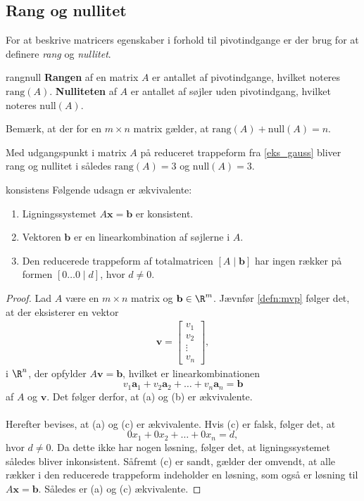 \subsection{Rang og nullitet}
% 
For at beskrive matricers egenskaber i forhold til pivotindgange er der brug for at definere \textit{rang} og \textit{nullitet}.
%
\begin{defn}{}{rangnull}
\textbf{Rangen} af en matrix $A$ er antallet af pivotindgange, hvilket noteres $\text{rang}(A)$.
\textbf{Nulliteten} af $A$ er antallet af søjler uden pivotindgang, hvilket noteres $\text{null}(A)$.
\end{defn}
%
\noindent
Bemærk, at der for en $m \times n$ matrix gælder, at $\text{rang}(A)+\text{null}(A)=n$.\\
%
\begin{eks}
Med udgangspunkt i matrix $A$ på reduceret trappeform fra \ref{eks_gauss} bliver rang og nullitet i således $\text{rang}(A)=3$ og $\text{null}(A)=3$.
\end{eks}
%
\begin{thm}{}{konsistens}
%
Følgende udsagn er ækvivalente:
%
\begin{enumerate}[label=(\alph*)]
\item Ligningssystemet $A\mathbf{x}=\mathbf{b}$ er konsistent.
\item Vektoren $\mathbf{b}$ er en linearkombination af søjlerne i $A$.
\item Den reducerede trappeform af totalmatricen $[A \mid \mathbf{b}]$ har ingen rækker på formen $[ 0 \ldots 0 \mid d ]$, hvor $d \neq 0$.
\end{enumerate}
%
\end{thm}
%
\newpage
%
\begin{proof}
%
Lad $A$ være en $m \times n$ matrix og $\mathbf{b} \in \R^m$. Jævnfør \ref{defn:mvp} følger det, at der eksisterer en vektor 
%
\begin{align*}    
       \mathbf{v} = \begin{bmatrix}
		v_{1} \\
        v_{2} \\
        \vdots \\
        v_{n} 
        \end{bmatrix},  
\end{align*}
%
i $\R^n$, der opfylder $A\mathbf{v}=\mathbf{b}$,
hvilket er linearkombinationen
%
$$v_1 \mathbf{a}_1+v_2 \mathbf{a}_2 + \ldots + v_n \mathbf{a}_n = \textbf{b}$$
%
af $A$ og $\textbf{v}$. 
Det følger derfor, at (a) og (b) er ækvivalente.\\\\
%
Herefter bevises, at (a) og (c) er ækvivalente. 
Hvis (c) er falsk, følger det, at
%
$$0 x_1+0 x_2 + \ldots + 0x_n =d,$$
%
hvor $d\neq0$. Da dette ikke har nogen løsning, følger det, at ligningssystemet således bliver inkonsistent. 
Såfremt (c) er sandt, gælder der omvendt, at alle rækker i den reducerede trappeform indeholder en løsning, som også er løsning til $A\mathbf{x}=\mathbf{b}$. 
Således er (a) og (c) ækvivalente.
%
\end{proof}
